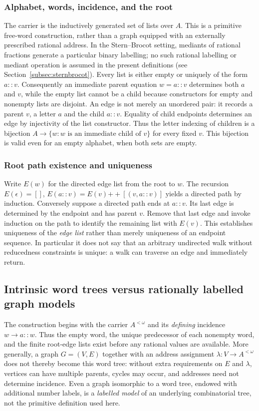 \documentclass[11pt,reqno]{amsart}
\theoremstyle{definition}\newtheorem{definition}[theorem]{Definition}
\theoremstyle{remark}\newtheorem{remark}[theorem]{Remark}
\begin{document}
\medskip
\subsubsection*{Alphabet, words, incidence, and the root}\label{supp:2-1}
The carrier is the inductively generated set of lists over $A$. This is a primitive free-word construction, rather than a graph equipped with an externally prescribed rational address. In the Stern--Brocot setting, mediants of rational fractions generate a particular binary labelling; no such rational labelling or mediant operation is assumed in the present definitions (see Section~\ref{subsec:sternbrocot}). Every list is either empty or uniquely of the form $a::v$. Consequently an immediate parent equation $w=a::v$ determines both $a$ and $v$, while the empty list cannot be a child because constructors for empty and nonempty lists are disjoint. An edge is not merely an unordered pair: it records a parent $v$, a letter $a$ and the child $a::v$. Equality of child endpoints determines an edge by injectivity of the list constructor. Thus the letter indexing of children is a bijection $A\to\{w:w\text{ is an immediate child of }v\}$ for every fixed $v$. This bijection is valid even for an empty alphabet, when both sets are empty.
\medskip
\medskip
\subsubsection*{Root path existence and uniqueness}\label{supp:2-2}
Write $E(w)$ for the directed edge list from the root to $w$. The recursion $E(\epsilon)=[]$, $E(a::v)=E(v)\mathbin{+\!+}[(v,a::v)]$ yields a directed path by induction. Conversely suppose a directed path ends at $a::v$. Its last edge is determined by the endpoint and has parent $v$. Remove that last edge and invoke induction on the path to identify the remaining list with $E(v)$. This establishes uniqueness of the \emph{edge list} rather than merely uniqueness of an endpoint sequence. In particular it does not say that an arbitrary undirected walk without reducedness constraints is unique: a walk can traverse an edge and immediately return.
\medskip

\subsection{Intrinsic word trees versus rationally labelled graph models}\label{main:sub-02}\label{subsec:sternbrocot}
The construction begins with the carrier $A^{<\omega}$ and its 
\emph{defining} incidence $w\longrightarrow a::w$. Thus the empty word, the
unique predecessor of each nonempty word, and the finite root-edge lists
exist before any rational values are available. More generally, a graph
$G=(V,E)$ together with an address assignment $\lambda:V\to A^{<\omega}$
does not thereby become this word tree: without extra requirements on $E$
and $\lambda$, vertices can have multiple parents, cycles may occur, and
addresses need not determine incidence. Even a graph isomorphic to a word
tree, endowed with additional number labels, is a \emph{labelled model} of
an underlying combinatorial tree, not the primitive definition used here.
\end{document}
